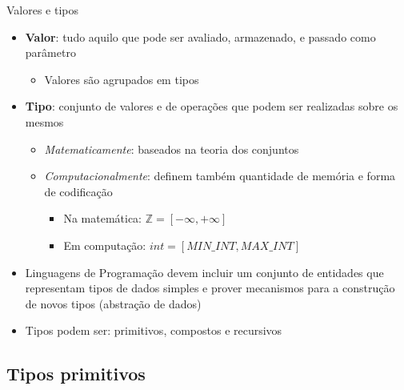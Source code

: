 \documentclass[handout]{beamer}
\begin{document}
\begin{frame}{Valores e tipos}
   \begin{itemize}
   \item \textbf{Valor}: tudo aquilo que pode ser avaliado, armazenado, e passado como parâmetro
		\begin{itemize}
			\item Valores são agrupados em tipos
		\end{itemize}
   \item \textbf{Tipo}: conjunto de valores e de operações que podem ser realizadas sobre os mesmos
		\begin{itemize}
			\item \textit{Matematicamente}: baseados na teoria dos conjuntos
			\item \textit{Computacionalmente}: definem também quantidade de memória e forma de codificação
				\begin{itemize}
					\item Na matemática: $\mathbb{Z} = [-\infty,+\infty]$
					\item Em computação: $int = [MIN\_INT, MAX\_INT]$
				\end{itemize}
		\end{itemize}
		\item Linguagens de Programação devem incluir um conjunto de entidades que representam tipos de dados simples e prover mecanismos para a construção de novos tipos (abstração de dados)
		\item Tipos podem ser: primitivos, compostos e recursivos
   \end{itemize}
\end{frame}

\subsection{Tipos primitivos}
\end{document}
